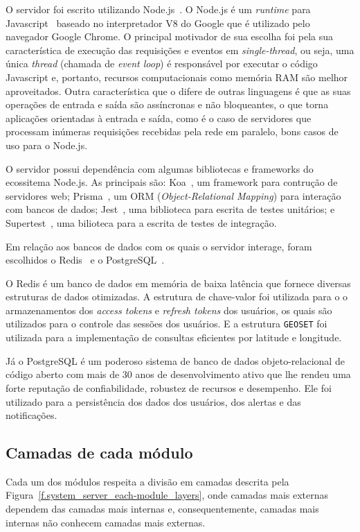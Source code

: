 O servidor foi escrito utilizando Node.js~\cite{node}. O Node.js é um \emph{runtime} para Javascript~\cite{javascript} baseado no interpretador V8 do Google que é utilizado pelo navegador Google Chrome. O principal motivador de sua escolha foi pela sua característica de execução das requisições e eventos em \emph{single-thread}, ou seja, uma única \emph{thread} (chamada de \emph{event loop}) é responsável por executar o código Javascript e, portanto, recursos computacionais como memória RAM são melhor aproveitados. Outra característica que o difere de outras linguagens é que as suas operações de entrada e saída são assíncronas e não bloqueantes, o que torna aplicações orientadas à entrada e saída, como é o caso de servidores que processam inúmeras requisições recebidas pela rede em paralelo, bons casos de uso para o Node.js. 

O servidor possui dependência com algumas bibliotecas e frameworks do ecossitema Node.js. As principais são: Koa~\cite{koa}, um framework para contrução de servidores web; Prisma~\cite{prisma}, um ORM (\emph{Object-Relational Mapping}) para interação com bancos de dados; Jest~\cite{jest}, uma biblioteca para escrita de testes unitários; e Supertest~\cite{supertest}, uma bilioteca para a escrita de testes de integração.

Em relação aos bancos de dados com os quais o servidor interage, foram escolhidos o Redis~\cite{redis} e o PostgreSQL~\cite{postgresql}. 

O Redis é um banco de dados em memória de baixa latência que fornece diversas estruturas de dados otimizadas. A estrutura de chave-valor foi utilizada para o o armazenamentos dos \emph{access tokens} e \emph{refresh tokens} dos usuários, os quais são utilizados para o controle das sessões dos usuários. E a estrutura \texttt{GEOSET} foi utilizada para a implementação de consultas eficientes por latitude e longitude.

Já o PostgreSQL é um poderoso sistema de banco de dados objeto-relacional de código aberto com mais de 30 anos de desenvolvimento ativo que lhe rendeu uma forte reputação de confiabilidade, robustez de recursos e desempenho. Ele foi utilizado para a persistência dos dados dos usuários, dos alertas e das notificações.

\subsection{Camadas de cada módulo}

Cada um dos módulos respeita a divisão em camadas descrita pela Figura~\ref{f.system_server_each-module_layers}, onde camadas mais externas dependem das camadas mais internas e, consequentemente, camadas mais internas não conhecem camadas mais externas. 

